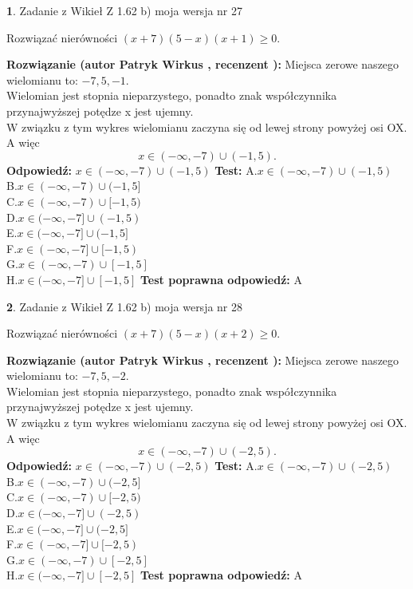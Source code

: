 \documentclass[12pt, a4paper]{article}
\theoremstyle{definition} %
\newtheorem{zad}{}
\newcommand{\zadStart}[1]{\begin{zad}#1\newline}
\newcommand{\zadStop}{\end{zad}}
\newcommand{\rozwStart}[2]{\noindent \textbf{Rozwiązanie (autor #1 , recenzent #2): }\newline}
\newcommand{\rozwStop}{\newline}
\newcommand{\odpStart}{\noindent \textbf{Odpowiedź:}\newline}
\newcommand{\odpStop}{\newline}
\newcommand{\testStart}{\noindent \textbf{Test:}\newline}
\newcommand{\testStop}{\newline}
\newcommand{\kluczStart}{\noindent \textbf{Test poprawna odpowiedź:}\newline}
\newcommand{\kluczStop}{\newline}
\begin{document}
\zadStart{Zadanie z Wikieł Z 1.62 b) moja wersja nr 27}

Rozwiązać nierówności $(x+7)(5-x)(x+1)\ge0$.
\zadStop
\rozwStart{Patryk Wirkus}{}
Miejsca zerowe naszego wielomianu to: $-7, 5, -1$.\\
Wielomian jest stopnia nieparzystego, ponadto znak współczynnika przy\linebreak najwyższej potędze x jest ujemny.\\ W związku z tym wykres wielomianu zaczyna się od lewej strony powyżej osi OX. A więc $$x \in (-\infty,-7) \cup (-1,5).$$
\rozwStop
\odpStart
$x \in (-\infty,-7) \cup (-1,5)$
\odpStop
\testStart
A.$x \in (-\infty,-7) \cup (-1,5)$\\
B.$x \in (-\infty,-7) \cup (-1,5]$\\
C.$x \in (-\infty,-7) \cup [-1,5)$\\
D.$x \in (-\infty,-7] \cup (-1,5)$\\
E.$x \in (-\infty,-7] \cup (-1,5]$\\
F.$x \in (-\infty,-7] \cup [-1,5)$\\
G.$x \in (-\infty,-7) \cup [-1,5]$\\
H.$x \in (-\infty,-7] \cup [-1,5]$
\testStop
\kluczStart
A
\kluczStop



\zadStart{Zadanie z Wikieł Z 1.62 b) moja wersja nr 28}

Rozwiązać nierówności $(x+7)(5-x)(x+2)\ge0$.
\zadStop
\rozwStart{Patryk Wirkus}{}
Miejsca zerowe naszego wielomianu to: $-7, 5, -2$.\\
Wielomian jest stopnia nieparzystego, ponadto znak współczynnika przy\linebreak najwyższej potędze x jest ujemny.\\ W związku z tym wykres wielomianu zaczyna się od lewej strony powyżej osi OX. A więc $$x \in (-\infty,-7) \cup (-2,5).$$
\rozwStop
\odpStart
$x \in (-\infty,-7) \cup (-2,5)$
\odpStop
\testStart
A.$x \in (-\infty,-7) \cup (-2,5)$\\
B.$x \in (-\infty,-7) \cup (-2,5]$\\
C.$x \in (-\infty,-7) \cup [-2,5)$\\
D.$x \in (-\infty,-7] \cup (-2,5)$\\
E.$x \in (-\infty,-7] \cup (-2,5]$\\
F.$x \in (-\infty,-7] \cup [-2,5)$\\
G.$x \in (-\infty,-7) \cup [-2,5]$\\
H.$x \in (-\infty,-7] \cup [-2,5]$
\testStop
\kluczStart
A
\kluczStop
\end{document}
